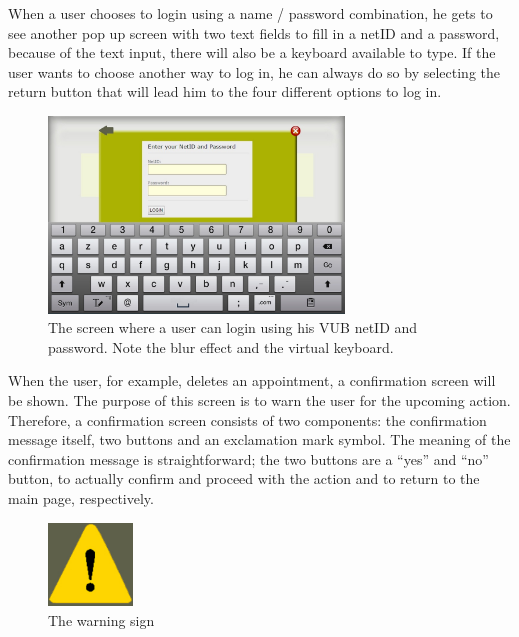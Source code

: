 \documentclass[11pt, a4paper,svglistings]{report}
\begin{document}
When a user chooses to login using a name / password combination, he gets to see another pop up screen with two text fields to fill in a netID and a password, because of the text input, there will also be a keyboard available to type. If the user wants to choose another way to log in, he can always do so by selecting the return button that will lead him to the four different options to log in.

\begin{figure}[H]
\centering
    \includegraphics[width=0.7\textwidth]{Textfield.jpg}
  \caption[Name / password combination login]{\label{fig:LoginScreen2}The screen where a user can login using his VUB netID and password. Note the blur effect and the virtual keyboard.}
\end{figure}

When the user, for example, deletes an appointment, a confirmation screen will be shown. The purpose of this screen is to warn the user for the upcoming action. Therefore, a confirmation screen consists of two components: the confirmation message itself, two buttons and an exclamation mark symbol. The meaning of the confirmation message is straightforward; the two buttons are a ``yes'' and ``no'' button, to actually confirm and proceed with the action and to return to the main page, respectively. 

\begin{figure}[H]
\centering
    \includegraphics[width=0.2\textwidth]{Warning.png}
  \caption[Warning sign]{\label{fig:WarningSign} The warning sign}
\end{figure}
\end{document}
